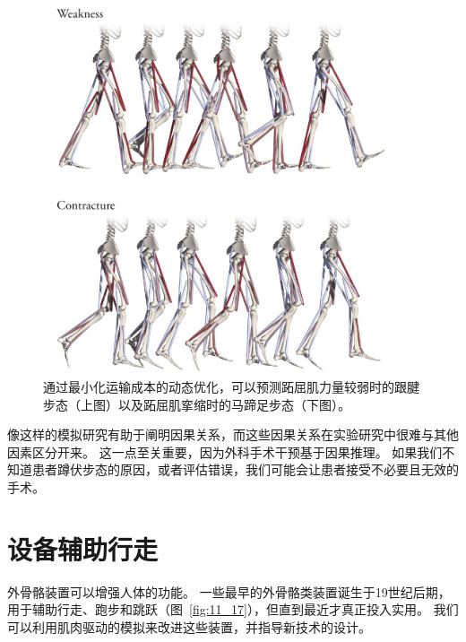 \begin{figure}[!htb]
	\centering
	\includegraphics[width=0.8\linewidth]{chap11/11_16}
	\caption{通过最小化运输成本的动态优化，可以预测跖屈肌力量较弱时的跟腱步态（上图）以及跖屈肌挛缩时的马蹄足步态（下图）\cite{ong2019predicting}。 \label{fig:11_16}}
\end{figure}


像这样的模拟研究有助于阐明因果关系，而这些因果关系在实验研究中很难与其他因素区分开来。
这一点至关重要，因为外科手术干预基于因果推理。
如果我们不知道患者蹲伏步态的原因，或者评估错误，我们可能会让患者接受不必要且无效的手术。


\section{设备辅助行走}

外骨骼装置可以增强人体的功能。
一些最早的外骨骼类装置诞生于19世纪后期，用于辅助行走、跑步和跳跃（图~\ref{fig:11_17}），但直到最近才真正投入实用。
我们可以利用肌肉驱动的模拟来改进这些装置，并指导新技术的设计。


